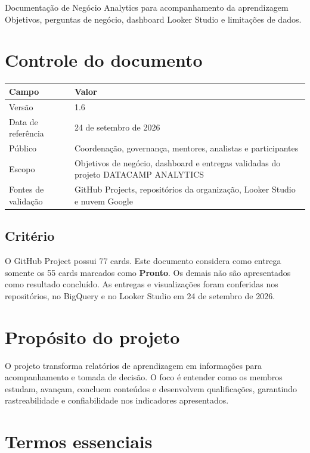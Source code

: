 \documentclass[11pt,a4paper]{article}
\begin{document}
\GemCover
  {Documentação de Negócio}
  {Analytics para acompanhamento da aprendizagem}
  {Objetivos, perguntas de negócio, dashboard Looker Studio e limitações de dados.}

\section*{Controle do documento}

\begin{tabularx}{\textwidth}{L{35mm}Y}
\toprule
\textbf{Campo} & \textbf{Valor} \\
\midrule
Versão & 1.6 \\
Data de referência & 24 de setembro de 2026 \\
Público & Coordenação, governança, mentores, analistas e participantes \\
Escopo & Objetivos de negócio, dashboard e entregas validadas do projeto DATACAMP ANALYTICS \\
Fontes de validação & GitHub Projects, repositórios da organização, Looker Studio e nuvem Google \\
\bottomrule
\end{tabularx}

\subsection*{Critério}

O GitHub Project possui 77 cards. Este documento considera como entrega somente
os 55 cards marcados como \textbf{Pronto}. Os demais não são apresentados como
resultado concluído. As entregas e visualizações foram conferidas nos repositórios,
no BigQuery e no Looker Studio em 24 de setembro de 2026.

\clearpage
\tableofcontents
\clearpage

\section{Propósito do projeto}

O projeto transforma relatórios de aprendizagem em informações para
acompanhamento e tomada de decisão. O foco é entender como os membros estudam,
avançam, concluem conteúdos e desenvolvem qualificações, garantindo rastreabilidade
e confiabilidade nos indicadores apresentados.

\section{Termos essenciais}
\end{document}
